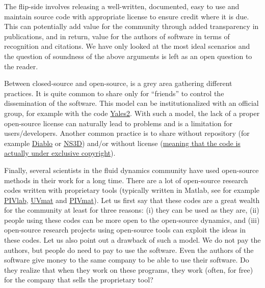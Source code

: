 The flip-side involves releasing a well-written, documented, easy to use and
maintain source code with appropriate license to ensure credit where it is due.
This can potentially add value for the community through added transparency in
publications, and in return, value for the authors of software in terms of
recognition and citations. We have only looked at the most ideal scenarios and
the question of soundness of the above arguments is left as an open question to
the reader.

Between closed-source and open-source, is a grey area gathering different
practices.
%
It is quite common to share only for ``friends'' to control the dissemination
of the software.
%
This model can be institutionalized with an official group, for example with
the code \href{https://www.coria-cfd.fr/index.php/YALES2}{Yales2}.
%
With such a model, the lack of a proper open-source license can naturally lead
to problems and is a limitation for users/developers.
%
Another common practice is to share without repository (for example
\href{http://www.damtp.cam.ac.uk/user/jrt51/files.html}{Diablo} or
\href{http://yakari.polytechnique.fr/people/deloncle/ns3d.html}{NS3D}) and/or
without license (\href{https://choosealicense.com/no-permission/}{meaning that the
code is actually under exclusive copyright}).

Finally, several scientists in the fluid dynamics community have used
open-source methods in their work for a long time.
%
There are a lot of open-source research codes written with proprietary tools
(typically written in Matlab, see for example
\href{http://pivlab.blogspot.de/}{PIVlab},
\href{http://servforge.legi.grenoble-inp.fr/projects/soft-uvmat/}{UVmat} and
\href{https://de.mathworks.com/matlabcentral/fileexchange/10902-pivmat-4-00}{PIVmat}).
%
Let us first say that these codes are a great wealth for the community at least
for three reasons: (i) they can be used as they are, (ii) people using these
codes can be more open to the open-source dynamics, and (iii) open-source
research projects using open-source tools can exploit the ideas in these codes.
%
Let us also point out a drawback of such a model. We do not pay the authors, but
people do need to pay to use the software. Even the authors of the software give
money to the same company to be able to use their software. Do they realize that
when they work on these programs, they work (often, for free) for the company that
sells the proprietary tool?

